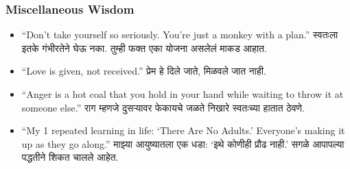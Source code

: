 \begin{frame}[fragile]\frametitle{Miscellaneous Wisdom}
\begin{itemize}
    \item ``Don’t take yourself so seriously. You’re just a monkey with a plan.'' स्वतःला इतके गंभीरतेने घेऊ नका. तुम्ही फक्त एका योजना असलेलं माकड आहात.

    \item ``Love is given, not received.'' प्रेम हे दिले जाते, मिळवले जात नाही.

    \item ``Anger is a hot coal that you hold in your hand while waiting to throw it at someone else.'' राग म्हणजे दुसऱ्यावर फेकायचे जळते निखारे स्वतःच्या हातात ठेवणे.

    \item ``My 1 repeated learning in life: ‘There Are No Adults.’ Everyone’s making it up as they go along.'' माझ्या आयुष्यातला एक धडा: ‘इथे कोणीही प्रौढ नाही.’ सगळे आपापल्या पद्धतीने शिकत चालले आहेत.
\end{itemize}
\end{frame}

